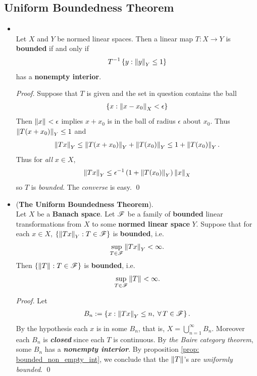 \documentclass[11pt]{article}
\begin{document}
\subsection{Uniform Boundedness Theorem}
\begin{itemize}
\item \begin{proposition}\label{prop: bounded_non_empty_int} \citep{reed1980methods}\\
Let $X$ and $Y$ be normed linear spaces. Then a linear map  $Τ: X\rightarrow Y$ is \textbf{bounded} if and only if 
\begin{align*}
T^{-1}\left\{y: \left\|y\right\|_{Y} \le 1\right\}
\end{align*} has a \textbf{nonempty interior}. 
\end{proposition}
\begin{proof}
Suppose that $T$ is given and the set in question contains the ball
\begin{align*}
\left\{x:  \left\|x - x_0\right\|_{X} < \epsilon\right\} 
\end{align*}
Then $\left\|x\right\|_{} < \epsilon$ implies  $x + x_0$ is in the ball of radius $\epsilon$ about $x_0$. Thus $\left\|T (x + x_0)\right\|_{Y} \le 1$ and 
\begin{align*}
\left\|T x\right\|_{Y} \le  \left\|T (x + x_0)\right\|_{Y} + \left\|T(x_0)\right\|_{Y} \le  1 + \left\|T(x_0)\right\|_{Y}.
\end{align*}
Thus for \emph{all} $x \in X$, 
\begin{align*}
\left\|T x\right\|_{Y} \le  \epsilon^{-1}\left(1 + \left\|T(x_0)\right\|_{Y}\right)\left\|x\right\|_{X} 
\end{align*}
so $Τ$ is \emph{bounded}. The \emph{converse} is easy. \qed
\end{proof}

\item \begin{theorem} (\textbf{The Uniform Boundedness Theorem}). \citep{reed1980methods} \\
Let $X$ be a \textbf{Banach space}. Let ${\mathscr F}$ be a family of \textbf{bounded} linear transformations from $X$ to some \textbf{normed linear space} $Y$. Suppose that for each $x \in X$, $\left\{\left\|Tx\right\|_{Y}:  T \in {\mathscr F}\right\}$ is  \textbf{bounded}, i.e.
\begin{align*}
\sup_{T \in {\mathscr F}}\left\|Tx\right\|_{Y} < \infty.
\end{align*} Then $\left\{\left\|T\right\|_{}: T \in {\mathscr F}\right\}$ is \textbf{bounded}, i.e.
\begin{align*}
\sup_{T \in {\mathscr F}}\left\|T\right\|_{} < \infty.
\end{align*}
\end{theorem}
\begin{proof}
Let 
\begin{align*}
B_n := \left\{x: \left\|Tx\right\|_{Y} \le n, \;\forall \, T \in {\mathscr F}\right\}.
\end{align*} By the hypothesis each $x$ is in some $B_n$, that is, $X = \bigcup_{n=1}^{\infty}B_n$.  Moreover each $B_n$ is \textbf{\emph{closed}} since each $T$ is  continuous. By \emph{the Baire category theorem}, some $B_n$ has a \emph{\textbf{nonempty interior}}. By proposition \ref{prop: bounded_non_empty_int}, we conclude that the $\left\|T\right\|_{}$'s are \emph{uniformly bounded}. \qed
\end{proof}


\end{itemize}
\end{document}
